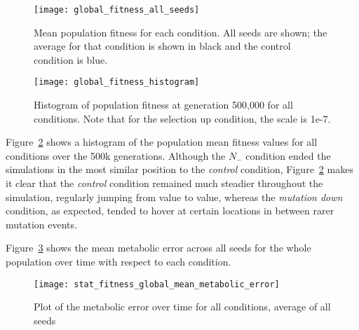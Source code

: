 \begin{figure}[H]
	\texttt{[image: global\_fitness\_all\_seeds]}
	\caption[Fitness all seeds all conditions]{Mean population fitness for each condition. All seeds are shown; the average for that condition is shown in black and the control condition is blue.}
	\label{fig:mean_fitness_all_seeds}
\end{figure}

\begin{figure}[H]
	\texttt{[image: global\_fitness\_histogram]}
	\caption[Mean fitness histogram]{Histogram of population fitness at generation 500,000 for all conditions. Note that for the selection up condition, the scale is 1e-7.}
	\label{fig:global_fitness_histogram}
\end{figure}
Figure~\ref{fig:global_fitness_histogram} shows a histogram of the population mean fitness values for all conditions over the 500k generations. Although the $N_-$ condition ended the simulations in the most similar position to the \textit{control} condition, Figure~\ref{fig:global_fitness_histogram} makes it clear that the \textit{control} condition remained much steadier throughout the simulation, regularly jumping from value to value, whereas the \textit{mutation down} condition, as expected, tended to hover at certain locations in between rarer mutation events. 

Figure~\ref{fig:mean_metabolic_error} shows the mean metabolic error across all seeds for the whole population over time with respect to each condition. 
\begin{figure}[H]
	\texttt{[image: stat\_fitness\_global\_mean\_metabolic\_error]}
	\caption[Metabolic error]{Plot of the metabolic error over time for all conditions, average of all seeds}
	\label{fig:mean_metabolic_error}
\end{figure}

